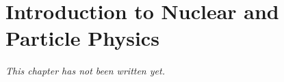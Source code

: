 \chapter{Introduction to Nuclear and Particle Physics}\label{ch:b3:nuclear-particle}


\emph{This chapter has not been written yet.}
